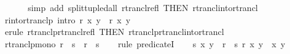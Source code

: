 \begin{isabellebody}
\ \ %
\isanewline
%
\isadelimproof
\ \ %
\endisadelimproof
%
\isatagproof
{}\isamarkupfalse%
\ {\isacharparenleft}{\kern0pt}simp\ add{\isacharcolon}{\kern0pt}\ split{\isacharunderscore}{\kern0pt}tupled{\isacharunderscore}{\kern0pt}all\ rtrancl{\isacharunderscore}{\kern0pt}refl\ {\isacharbrackleft}{\kern0pt}THEN\ rtrancl{\isacharunderscore}{\kern0pt}into{\isacharunderscore}{\kern0pt}rtrancl{\isacharbrackright}{\kern0pt}{\isacharparenright}{\kern0pt}%
\endisatagproof
{\isafoldproof}%
%
\isadelimproof
\isanewline
%
\endisadelimproof
\isanewline
{}\isamarkupfalse%
\ r{\isacharunderscore}{\kern0pt}into{\isacharunderscore}{\kern0pt}rtranclp\ {\isacharbrackleft}{\kern0pt}intro{\isacharbrackright}{\kern0pt}{\isacharcolon}{\kern0pt}\ {\isachardoublequoteopen}r\ x\ y\ {\isasymLongrightarrow}\ r\isactrlsup {\isacharasterisk}{\kern0pt}\isactrlsup {\isacharasterisk}{\kern0pt}\ x\ y{\isachardoublequoteclose}\isanewline
\ \ %
\isanewline
%
\isadelimproof
\ \ %
\endisadelimproof
%
\isatagproof
{}\isamarkupfalse%
\ {\isacharparenleft}{\kern0pt}erule\ rtranclp{\isachardot}{\kern0pt}rtrancl{\isacharunderscore}{\kern0pt}refl\ {\isacharbrackleft}{\kern0pt}THEN\ rtranclp{\isachardot}{\kern0pt}rtrancl{\isacharunderscore}{\kern0pt}into{\isacharunderscore}{\kern0pt}rtrancl{\isacharbrackright}{\kern0pt}{\isacharparenright}{\kern0pt}%
\endisatagproof
{\isafoldproof}%
%
\isadelimproof
\isanewline
%
\endisadelimproof
\isanewline
{}\isamarkupfalse%
\ rtranclp{\isacharunderscore}{\kern0pt}mono{\isacharcolon}{\kern0pt}\ {\isachardoublequoteopen}r\ {\isasymle}\ s\ {\isasymLongrightarrow}\ r\isactrlsup {\isacharasterisk}{\kern0pt}\isactrlsup {\isacharasterisk}{\kern0pt}\ {\isasymle}\ s\isactrlsup {\isacharasterisk}{\kern0pt}\isactrlsup {\isacharasterisk}{\kern0pt}{\isachardoublequoteclose}\isanewline
\ \ %
\isanewline
%
\isadelimproof
%
\endisadelimproof
%
\isatagproof
{}\isamarkupfalse%
\ {\isacharparenleft}{\kern0pt}rule\ predicate{}I{\isacharparenright}{\kern0pt}\isanewline
\ \ \isamarkupfalse%
\ {\isachardoublequoteopen}s\isactrlsup {\isacharasterisk}{\kern0pt}\isactrlsup {\isacharasterisk}{\kern0pt}\ x\ y{\isachardoublequoteclose}\ \ {\isachardoublequoteopen}r\ {\isasymle}\ s{\isachardoublequoteclose}\ {\isachardoublequoteopen}r\isactrlsup {\isacharasterisk}{\kern0pt}\isactrlsup {\isacharasterisk}{\kern0pt}\ x\ y{\isachardoublequoteclose}\ \ x\ y\isanewline

\end{isabellebody}
